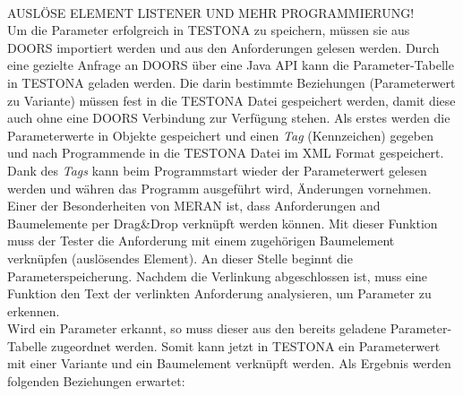 \paragraph{}

AUSLÖSE ELEMENT LISTENER UND MEHR PROGRAMMIERUNG!\\

 
 
Um die Parameter erfolgreich in TESTONA zu speichern, müssen sie aus DOORS importiert werden und aus den Anforderungen gelesen werden. Durch eine gezielte Anfrage an DOORS über eine Java API kann die Parameter-Tabelle in TESTONA geladen werden. Die darin bestimmte Beziehungen (Parameterwert zu Variante) müssen fest in die TESTONA Datei gespeichert werden, damit diese auch ohne eine DOORS Verbindung zur Verfügung stehen. Als erstes werden die Parameterwerte in Objekte gespeichert und einen \textit{Tag} (Kennzeichen) gegeben und nach Programmende in die TESTONA Datei im XML Format gespeichert. Dank des \textit{Tags} kann beim Programmstart wieder der Parameterwert gelesen werden und währen das Programm ausgeführt wird, Änderungen vornehmen.\\

Einer der Besonderheiten von MERAN ist, dass Anforderungen and Baumelemente per Drag\&Drop verknüpft werden können. Mit dieser Funktion muss der Tester die Anforderung mit einem zugehörigen Baumelement verknüpfen (auslösendes Element). An dieser Stelle beginnt die Parameterspeicherung. Nachdem die Verlinkung abgeschlossen ist, muss eine Funktion den Text der verlinkten Anforderung analysieren, um Parameter zu erkennen.\\

Wird ein Parameter erkannt, so muss dieser aus den bereits geladene Parameter-Tabelle zugeordnet werden. Somit kann jetzt in TESTONA ein Parameterwert mit einer Variante und ein Baumelement verknüpft werden. Als Ergebnis werden folgenden Beziehungen erwartet:

